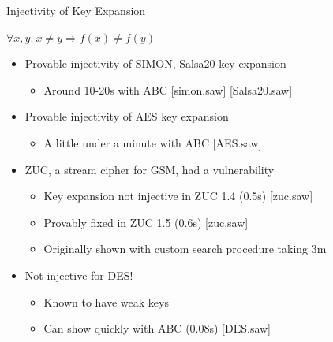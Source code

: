 \documentclass[ignorenonframetext,]{beamer}
\providecommand{\tightlist}{%
  \setlength{\itemsep}{0pt}\setlength{\parskip}{0pt}}
\newcommand{\infile}[1]{{\tiny \alert{[#1]}}}
\begin{document}
\begin{frame}{Injectivity of Key Expansion}

\begin{center}
$\forall x, y.~x \neq y \Rightarrow f(x) \neq f(y)$
\end{center}

\begin{itemize}
\tightlist
\item
  Provable injectivity of SIMON, Salsa20 key expansion

  \begin{itemize}
  \tightlist
  \item
    Around 10-20s with ABC \infile{simon.saw} \infile{Salsa20.saw}
  \end{itemize}
\item
  Provable injectivity of AES key expansion

  \begin{itemize}
  \tightlist
  \item
    A little under a minute with ABC \infile{AES.saw}
  \end{itemize}
\item
  ZUC, a stream cipher for GSM, had a vulnerability

  \begin{itemize}
  \tightlist
  \item
    Key expansion not injective in ZUC 1.4 (0.5s) \infile{zuc.saw}
  \item
    Provably fixed in ZUC 1.5 (0.6s) \infile{zuc.saw}
  \item Originally shown with custom search procedure taking 3m
    \cite{wang2012zuc}
  \end{itemize}
\item
  \alert{Not injective} for DES!

  \begin{itemize}
  \tightlist
  \item
    Known to have weak keys
  \item
    Can show quickly with ABC (0.08s) \infile{DES.saw}
  \end{itemize}
\end{itemize}

\end{frame}
\end{document}
